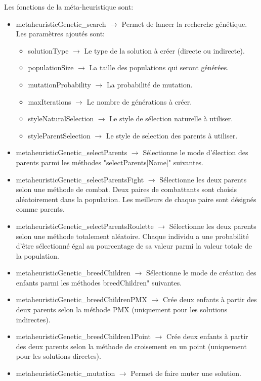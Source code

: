 \documentclass{EPUProjetPeiP}
\begin{document}
Les fonctions de la méta-heuristique sont:
\begin{itemize}
	\item metaheuristicGenetic\_search $\longrightarrow$ Permet de lancer la recherche génétique. Les paramètres ajoutés sont:
	\begin{itemize}
		\item solutionType $\longrightarrow$ Le type de la solution à créer (directe ou indirecte).
		\item populationSize $\longrightarrow$ La taille des populations qui seront générées.
		\item mutationProbability $\longrightarrow$ La probabilité de mutation.
		\item maxIterations $\longrightarrow$ Le nombre de générations à créer.
		\item styleNaturalSelection $\longrightarrow$ Le style de sélection naturelle à utiliser.
		\item styleParentSelection $\longrightarrow$ Le style de selection des parents à utiliser.
	\end{itemize}
	\item metaheuristicGenetic\_selectParents $\longrightarrow$ Sélectionne le mode d'élection des parents parmi les méthodes "selectParents[Name]" suivantes.
	\item metaheuristicGenetic\_selectParentsFight $\longrightarrow$ Sélectionne les deux parents selon une méthode de combat. Deux paires de combattants sont choisis aléatoirement dans la population. Les meilleurs de chaque paire sont désignés comme parents.
	\item metaheuristicGenetic\_selectParentsRoulette $\longrightarrow$ Sélectionne les deux parents selon une méthode totalement aléatoire. Chaque individu a une probabilité d'être sélectionné égal au pourcentage de sa valeur parmi la valeur totale de la population.
	\item metaheuristicGenetic\_breedChildren $\longrightarrow$ Sélectionne le mode de création des enfants parmi les méthodes breedChildren" suivantes.
	\item metaheuristicGenetic\_breedChildrenPMX $\longrightarrow$ Crée deux enfants à partir des deux parents selon la méthode PMX (uniquement pour les solutions indirectes).
	\item metaheuristicGenetic\_breedChildren1Point $\longrightarrow$ Crée deux enfants à partir des deux parents selon la méthode de croisement en un point (uniquement pour les solutions directes).
	\item metaheuristicGenetic\_mutation $\longrightarrow$ Permet de faire muter une solution.

\end{itemize}
\end{document}
